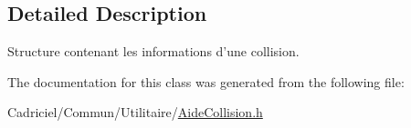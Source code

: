 \subsection{Detailed Description}
Structure contenant les informations d'une collision. 

The documentation for this class was generated from the following file\-:\begin{DoxyCompactItemize}
\item 
Cadriciel/\-Commun/\-Utilitaire/\hyperlink{_aide_collision_8h}{Aide\-Collision.\-h}\end{DoxyCompactItemize}
